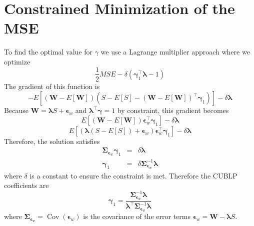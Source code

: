 \documentclass[man, floatsintext]{apa7}
\newcommand{\mbf}[1]{\bm{#1}}
\newcommand{\beps}{\mbf{\epsilon}}
\newcommand{\bgamma}{\mbf{\gamma}}
\newcommand{\blambda}{\mbf{\lambda}}
\newcommand{\bW}{\mbf{W}}
\DeclareMathOperator{\Cov}{Cov}
\begin{document}
  \printbibliography 
  \appendix
  \section{Constrained Minimization of the MSE}
  \label{app:optim}
  To find the optimal value for $\gamma$ we use a Lagrange multiplier
  approach where we optimize
  \[ \frac{1}{2} MSE - \delta (\mbf{\gamma}_1^\top \mbf{\lambda}-1 ) \]
  The gradient of this function is
  \[ - E\left [ (\mbf{W} - E[\mbf{W}] ) ( S -E[S] - 
      (\mbf{W} - E[\mbf{W}] )^\top \mbf{\gamma}_1) \right] - \delta
    \mbf{\lambda} \]
  Because $\mbf{W} = \mbf{\lambda} S + \beps_w $ and $\mbf{\lambda}^\top
  \mbf{\gamma} = 1$ by constraint, this gradient becomes
  \[ E \left [ (\bW - E[\bW]) \beps_w^\top \bgamma_1 \right ] - \delta
    \blambda \]
  \[ E \left [ (\blambda (S-E[S]) + \beps_w ) \beps_w^\top \bgamma_1 \right ] -
  \delta
    \blambda \]
  Therefore, the solution satisfies
  \begin{eqnarray*}
    \mbf{\Sigma}_{\beps_w} \bgamma_1 &=& \delta \blambda \\
    \bgamma_1 &=& \delta \mbf{\Sigma}^{-1}_{\beps_w} \blambda
  \end{eqnarray*}
  where $\delta$ is a constant to ensure the constraint is met.
  Therefore the CUBLP coefficients are
  \begin{equation}
    \bgamma_{1} = \frac{\mbf{\Sigma}^{-1}_{\beps_w} \blambda}{
      \blambda^\top \mbf{\Sigma}^{-1}_{\beps_w} \blambda}
    \label{eq:blup}
  \end{equation}
  where $\mbf{\Sigma}_{\beps_w} = \Cov(\beps_w)$ is the covariance of
  the error terms $\beps_w = \bW - \blambda S $.
  
\end{document}
